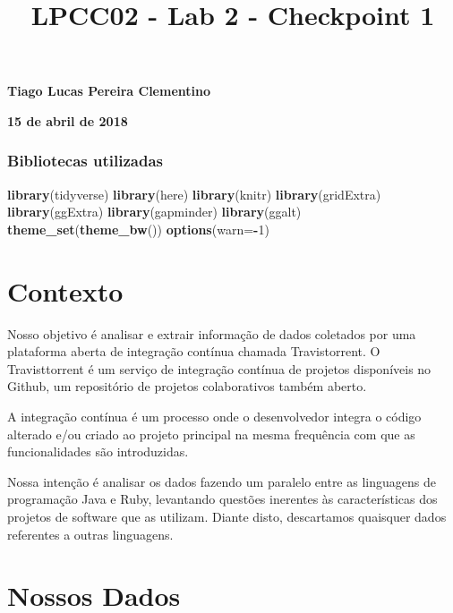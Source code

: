 \documentclass[]{article}
\title{LPCC02 - Lab 2 - Checkpoint 1}
\author{}
\date{}
\newenvironment{Shaded}{\begin{snugshade}}{\end{snugshade}}
\newcommand{\KeywordTok}[1]{\textcolor[rgb]{0.13,0.29,0.53}{\textbf{#1}}}
\newcommand{\DataTypeTok}[1]{\textcolor[rgb]{0.13,0.29,0.53}{#1}}
\newcommand{\DecValTok}[1]{\textcolor[rgb]{0.00,0.00,0.81}{#1}}
\newcommand{\OperatorTok}[1]{\textcolor[rgb]{0.81,0.36,0.00}{\textbf{#1}}}
\newcommand{\NormalTok}[1]{#1}
\begin{document}
\maketitle

\textbf{Tiago Lucas Pereira Clementino}

\textbf{15 de abril de 2018}

\subsubsection{Bibliotecas utilizadas}\label{bibliotecas-utilizadas}

\begin{Shaded}
\begin{Highlighting}[]
\KeywordTok{library}\NormalTok{(tidyverse)}
\KeywordTok{library}\NormalTok{(here)}
\KeywordTok{library}\NormalTok{(knitr)}
\KeywordTok{library}\NormalTok{(gridExtra)}
\KeywordTok{library}\NormalTok{(ggExtra)}
\KeywordTok{library}\NormalTok{(gapminder)}
\KeywordTok{library}\NormalTok{(ggalt)}
\KeywordTok{theme_set}\NormalTok{(}\KeywordTok{theme_bw}\NormalTok{())}
\KeywordTok{options}\NormalTok{(}\DataTypeTok{warn=}\OperatorTok{-}\DecValTok{1}\NormalTok{)}
\end{Highlighting}
\end{Shaded}

\section{Contexto}\label{contexto}

Nosso objetivo é analisar e extrair informação de dados coletados por
uma plataforma aberta de integração contínua chamada Travistorrent. O
Travisttorrent é um serviço de integração contínua de projetos
disponíveis no Github, um repositório de projetos colaborativos também
aberto.

A integração contínua é um processo onde o desenvolvedor integra o
código alterado e/ou criado ao projeto principal na mesma frequência com
que as funcionalidades são introduzidas.

Nossa intenção é analisar os dados fazendo um paralelo entre as
linguagens de programação Java e Ruby, levantando questões inerentes às
características dos projetos de software que as utilizam. Diante disto,
descartamos quaisquer dados referentes a outras linguagens.

\section{Nossos Dados}\label{nossos-dados}
\end{document}

